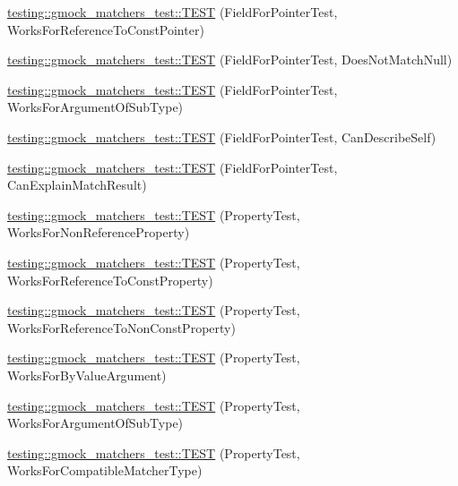 \begin{DoxyCompactItemize}
\item 
\hyperlink{namespacetesting_1_1gmock__matchers__test_a603253edc7a2310c8a1db225cb589a99}{testing\+::gmock\+\_\+matchers\+\_\+test\+::\+T\+E\+ST} (Field\+For\+Pointer\+Test, Works\+For\+Reference\+To\+Const\+Pointer)
\item 
\hyperlink{namespacetesting_1_1gmock__matchers__test_a06a1c8d949707ab606627e9f6efe87b9}{testing\+::gmock\+\_\+matchers\+\_\+test\+::\+T\+E\+ST} (Field\+For\+Pointer\+Test, Does\+Not\+Match\+Null)
\item 
\hyperlink{namespacetesting_1_1gmock__matchers__test_a5447541a290e16a81aec6dd975983d57}{testing\+::gmock\+\_\+matchers\+\_\+test\+::\+T\+E\+ST} (Field\+For\+Pointer\+Test, Works\+For\+Argument\+Of\+Sub\+Type)
\item 
\hyperlink{namespacetesting_1_1gmock__matchers__test_a056670af8fc7bd3dfd170435dbf08c3c}{testing\+::gmock\+\_\+matchers\+\_\+test\+::\+T\+E\+ST} (Field\+For\+Pointer\+Test, Can\+Describe\+Self)
\item 
\hyperlink{namespacetesting_1_1gmock__matchers__test_a6a4ffd283f91f4e085aa582aedefe38e}{testing\+::gmock\+\_\+matchers\+\_\+test\+::\+T\+E\+ST} (Field\+For\+Pointer\+Test, Can\+Explain\+Match\+Result)
\item 
\hyperlink{namespacetesting_1_1gmock__matchers__test_a9c42c3b244c7b4d63040e469d5b31e1e}{testing\+::gmock\+\_\+matchers\+\_\+test\+::\+T\+E\+ST} (Property\+Test, Works\+For\+Non\+Reference\+Property)
\item 
\hyperlink{namespacetesting_1_1gmock__matchers__test_a7254899c6d45df648d5b4ef6eece3ae0}{testing\+::gmock\+\_\+matchers\+\_\+test\+::\+T\+E\+ST} (Property\+Test, Works\+For\+Reference\+To\+Const\+Property)
\item 
\hyperlink{namespacetesting_1_1gmock__matchers__test_a5b7b02e8fcef1aff9a4afc81d5fb5d5f}{testing\+::gmock\+\_\+matchers\+\_\+test\+::\+T\+E\+ST} (Property\+Test, Works\+For\+Reference\+To\+Non\+Const\+Property)
\item 
\hyperlink{namespacetesting_1_1gmock__matchers__test_af703b24e2bee13cf7a042f699809a5ab}{testing\+::gmock\+\_\+matchers\+\_\+test\+::\+T\+E\+ST} (Property\+Test, Works\+For\+By\+Value\+Argument)
\item 
\hyperlink{namespacetesting_1_1gmock__matchers__test_a38a5ad623dda9ef0f48ebaf65485d18e}{testing\+::gmock\+\_\+matchers\+\_\+test\+::\+T\+E\+ST} (Property\+Test, Works\+For\+Argument\+Of\+Sub\+Type)
\item 
\hyperlink{namespacetesting_1_1gmock__matchers__test_a17b7a59d1dbca0692ebaa71e6f46f1d6}{testing\+::gmock\+\_\+matchers\+\_\+test\+::\+T\+E\+ST} (Property\+Test, Works\+For\+Compatible\+Matcher\+Type)

\end{DoxyCompactItemize}
